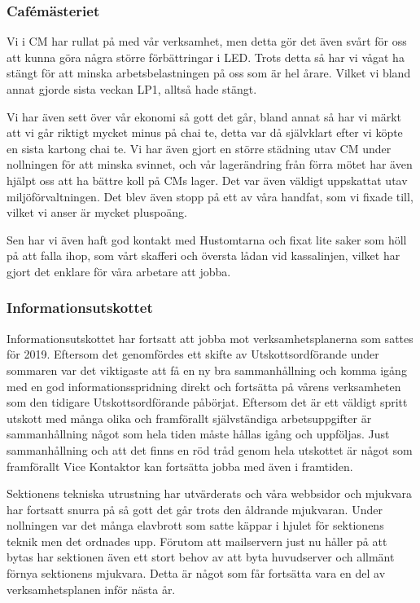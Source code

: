 \documentclass[../_main/handlingar.tex]{subfiles}
\begin{document}
\subsubsection*{Cafémästeriet}

Vi i CM har rullat på med vår verksamhet, men detta gör det även svårt för oss att kunna göra några större förbättringar i LED. Trots detta så har vi vågat ha stängt för att minska arbetsbelastningen på oss som är hel årare. Vilket vi bland annat gjorde sista veckan LP1, alltså hade stängt. 

Vi har även sett över vår ekonomi så gott det går, bland annat så har vi märkt att vi går riktigt mycket minus på chai te, detta var då självklart efter vi köpte en sista kartong chai te. Vi har även gjort en större städning utav CM under nollningen för att minska svinnet, och vår lagerändring från förra mötet har även hjälpt oss att ha bättre koll på CMs lager. Det var även väldigt uppskattat utav miljöförvaltningen. Det blev även stopp på ett av våra handfat, som vi fixade till, vilket vi anser är mycket pluspoäng. 

Sen har vi även haft god kontakt med Hustomtarna och fixat lite saker som höll på att falla ihop, som vårt skafferi och översta lådan vid kassalinjen, vilket har gjort det enklare för våra arbetare att jobba.

\subsubsection*{Informationsutskottet}

Informationsutskottet har fortsatt att jobba mot verksamhetsplanerna som sattes för 2019. Eftersom det genomfördes ett skifte av Utskottsordförande under sommaren var det viktigaste att få en ny bra sammanhållning och komma igång med en god informationsspridning direkt och fortsätta på vårens verksamheten som den tidigare Utskottsordförande påbörjat. Eftersom det är ett väldigt spritt utskott med många olika och framförallt självständiga arbetsuppgifter är sammanhållning något som hela tiden måste hållas igång och uppföljas. Just sammanhållning och att det finns en röd tråd genom hela utskottet är något som framförallt Vice Kontaktor kan fortsätta jobba med även i framtiden. 

Sektionens tekniska utrustning har utvärderats och våra webbsidor och mjukvara har fortsatt snurra på så gott det går trots den åldrande mjukvaran. Under nollningen var det många elavbrott som satte käppar i hjulet för sektionens teknik men det ordnades upp. Förutom att mailservern just nu håller på att bytas har sektionen även ett stort behov av att byta huvudserver och allmänt förnya sektionens mjukvara. Detta är något som får fortsätta vara en del av verksamhetsplanen inför nästa år.
\end{document}
